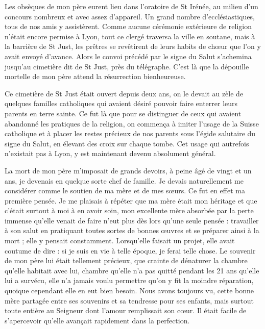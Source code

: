 \documentclass[11pt,a4paper]{report}
\begin{document}
Les obsèques de mon père eurent lieu dans l'oratoire de St Irénée, au milieu d'un concours nombreux et avec assez d'appareil. Un grand nombre d'ecclésiastiques, tous de nos amis y assistèrent. Comme aucune cérémonie extérieure de religion n'était encore permise à Lyon, tout ce clergé traversa la ville en soutane, mais à la barrière de St Just, les prêtres se revêtirent de leurs habits de chœur que l'on y avait envoyé d'avance. Alors le convoi précédé par le signe du Salut s'achemina jusqu'au cimetière dit de St Just, près du télégraphe. C'est là que la dépouille mortelle de mon père attend la résurrection bienheureuse.

Ce cimetière de St Just était ouvert depuis deux ans, on le devait au zèle de quelques familles catholiques qui avaient désiré pouvoir faire enterrer leurs parents en terre sainte. Ce fut là que pour se distinguer de ceux qui avaient abandonné les pratiques de la religion, on commença à imiter l'usage de la Suisse catholique et à placer les restes précieux de nos parents sous l'égide salutaire du signe du Salut, en élevant des croix sur chaque tombe. Cet usage qui autrefois n'existait pas à Lyon, y est maintenant devenu absolument général.

La mort de mon père m'imposait de grands devoirs, à peine âgé de vingt et un ans, je devenais en quelque sorte chef de famille. Je devais naturellement me considérer comme le soutien de ma mère et de mes sœurs. Ce fut en effet ma première pensée. Je me plaisais à répéter que ma mère était mon héritage et que c'était surtout à moi à en avoir soin, mon excellente mère absorbée par la perte immense qu'elle venait de faire n'eut plus dès lors qu'une seule pensée : travailler à son salut en pratiquant toutes sortes de bonnes œuvres et se préparer ainsi à la mort ; elle y pensait constamment. Lorsqu'elle faisait un projet, elle avait coutume de dire : si je suis en vie à telle époque, je ferai telle chose. Le souvenir de mon père lui était tellement précieux, que crainte de dénaturer la chambre qu'elle habitait avec lui, chambre qu'elle n'a pas quitté pendant les 21 ans qu'elle lui a survécu, elle n'a jamais voulu permettre qu'on y fit la moindre réparation, quoique cependant elle en eut bien besoin. Nous avons toujours vu, cette bonne mère partagée entre ses souvenirs et sa tendresse pour ses enfants, mais surtout toute entière au Seigneur dont l'amour remplissait son cœur. Il était facile de s'apercevoir qu'elle avançait rapidement dans la perfection.
\end{document}
